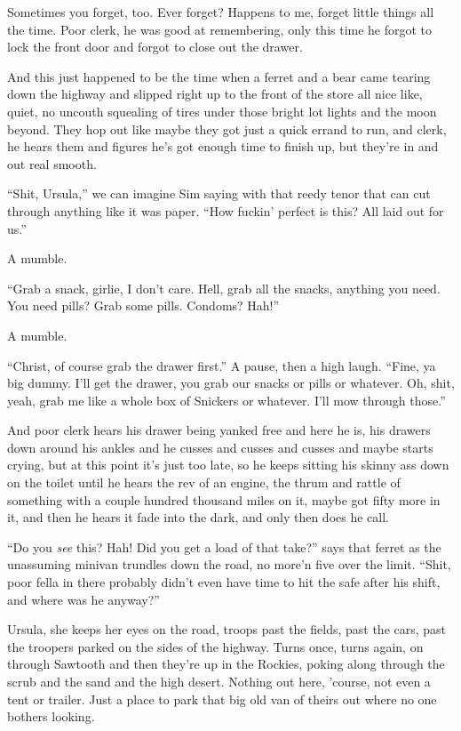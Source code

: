 Sometimes you forget, too. Ever forget? Happens to me, forget little things all the time. Poor clerk, he was good at remembering, only this time he forgot to lock the front door and forgot to close out the drawer.

And this just happened to be the time when a ferret and a bear came tearing down the highway and slipped right up to the front of the store all nice like, quiet, no uncouth squealing of tires under those bright lot lights and the moon beyond. They hop out like maybe they got just a quick errand to run, and clerk, he hears them and figures he's got enough time to finish up, but they're in and out real smooth.

``Shit, Ursula,'' we can imagine Sim saying with that reedy tenor that can cut through anything like it was paper. ``How fuckin' perfect is this? All laid out for us.''

A mumble.

``Grab a snack, girlie, I don't care. Hell, grab all the snacks, anything you need. You need pills? Grab some pills. Condoms? Hah!''

A mumble.

``Christ, of course grab the drawer first.'' A pause, then a high laugh. ``Fine, ya big dummy. I'll get the drawer, you grab our snacks or pills or whatever. Oh, shit, yeah, grab me like a whole box of Snickers or whatever. I'll mow through those.''

And poor clerk hears his drawer being yanked free and here he is, his drawers down around his ankles and he cusses and cusses and cusses and maybe starts crying, but at this point it's just too late, so he keeps sitting his skinny ass down on the toilet until he hears the rev of an engine, the thrum and rattle of something with a couple hundred thousand miles on it, maybe got fifty more in it, and then he hears it fade into the dark, and only then does he call.

``Do you \emph{see} this? Hah! Did you get a load of that take?'' says that ferret as the unassuming minivan trundles down the road, no more'n five over the limit. ``Shit, poor fella in there probably didn't even have time to hit the safe after his shift, and where was he anyway?''

Ursula, she keeps her eyes on the road, troops past the fields, past the cars, past the troopers parked on the sides of the highway. Turns once, turns again, on through Sawtooth and then they're up in the Rockies, poking along through the scrub and the sand and the high desert. Nothing out here, 'course, not even a tent or trailer. Just a place to park that big old van of theirs out where no one bothers looking.

